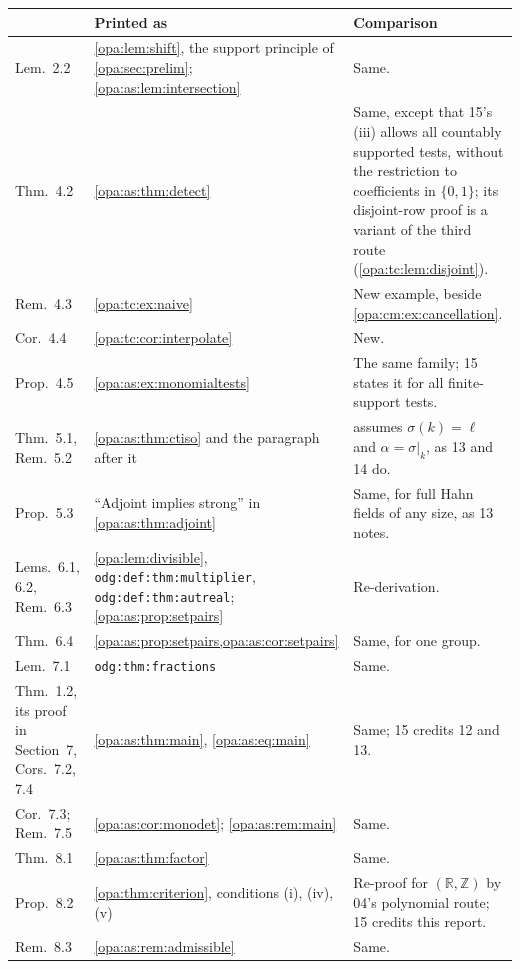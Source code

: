 \documentclass[11pt,oneside]{article}
\numberwithin{equation}{section}
\theoremstyle{definition}
\theoremstyle{remark}
\newcommand{\R}{\mathbb R}
\newcommand{\Z}{\mathbb Z}
\newcommand{\lbl}[1]{\nolinkurl{#1}}
\begin{document}
\begin{center}
\renewcommand{\arraystretch}{1.15}
\begin{longtable}{>{\raggedright\arraybackslash}p{}>{\raggedright\arraybackslash}p{}>{\raggedright\arraybackslash}p{}}
\toprule
15 & Printed as & Comparison\\
\midrule
\endhead
Lem.~2.2 & \cref{opa:lem:shift}, the support principle of \cref{opa:sec:prelim};
\cref{opa:as:lem:intersection} & Same.\\
Thm.~4.2 & \cref{opa:as:thm:detect} & Same, except that 15's (iii) allows all countably supported tests,
without the restriction to coefficients in $\{0,1\}$; its disjoint-row proof is a variant of the third
route (\cref{opa:tc:lem:disjoint}).\\
Rem.~4.3 & \cref{opa:tc:ex:naive} & New example, beside \cref{opa:cm:ex:cancellation}.\\
Cor.~4.4 & \cref{opa:tc:cor:interpolate} & New.\\
Prop.~4.5 & \cref{opa:as:ex:monomialtests} & The same family; 15 states it for all finite-support
tests.\\
Thm.~5.1, Rem.~5.2 & \cref{opa:as:thm:ctiso} and the paragraph after it & 15 assumes $\sigma(k)=\ell$
and $\alpha=\sigma|_k$, as 13 and 14 do.\\
Prop.~5.3 & ``Adjoint implies strong'' in \cref{opa:as:thm:adjoint} & Same, for full Hahn fields of
any size, as 13 notes.\\
Lems.~6.1, 6.2, Rem.~6.3 & \cref{opa:lem:divisible}, \lbl{odg:def:thm:multiplier},
\lbl{odg:def:thm:autreal}; \cref{opa:as:prop:setpairs} & Re-derivation.\\
Thm.~6.4 & \cref{opa:as:prop:setpairs,opa:as:cor:setpairs} & Same, for one group.\\
Lem.~7.1 & \lbl{odg:thm:fractions} & Same.\\
Thm.~1.2, its proof in Section~7, Cors.~7.2, 7.4 & \cref{opa:as:thm:main}, \eqref{opa:as:eq:main} &
Same; 15 credits 12 and 13.\\
Cor.~7.3; Rem.~7.5 & \cref{opa:as:cor:monodet}; \cref{opa:as:rem:main} & Same.\\
Thm.~8.1 & \cref{opa:as:thm:factor} & Same.\\
Prop.~8.2 & \cref{opa:thm:criterion}, conditions (i), (iv), (v) & Re-proof for $(\R,\Z)$ by 04's
polynomial route; 15 credits this report.\\
Rem.~8.3 & \cref{opa:as:rem:admissible} & Same.\\

\end{longtable}
\end{center}
\end{document}
